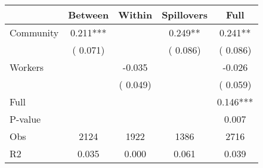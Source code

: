 
\begin{tabular}{l*{4}{c}}\hline&\multicolumn{1}{c}{Between}&\multicolumn{1}{c}{Within}&\multicolumn{1}{c}{Spillovers}&\multicolumn{1}{c}{Full}\\ \hline
 Community             &              0.211***      &                                               &        0.249** &         0.241**                            \\ 
                               &        (       0.071)           &                                       &       (       0.086)     &      (       0.086)                                           \\ 
 Workers       &                                               &       -0.035    &                                &            -0.026                            \\ 
                               &                                               & (       0.049)                  &                                        &      (       0.059)                                           \\ 
\hline                                                                                                                                                                                                                                            
 Full                  &                                               &                                               &                                        &             0.146***                                     \\ 
 P-value               &                                               &                                               &                                        &             0.007                                           \\ 
 Obs                   &               2124               &       1922                       &       1386                &              2716                                               \\ 
 R2                    &                      0.035              &              0.000                      &              0.061               &                     0.039                                              \\ 
\hline \end{tabular}                                                                                                                                                                                                              